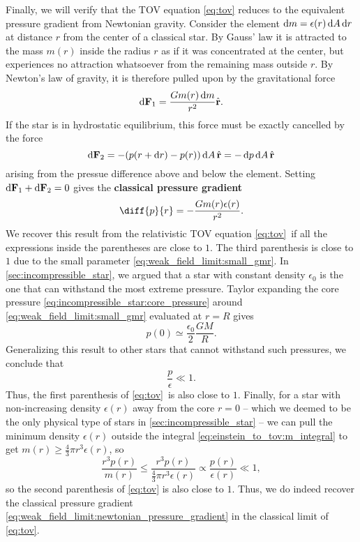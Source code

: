 Finally, we will verify that the TOV equation \eqref{eq:tov} reduces to the equivalent pressure gradient from Newtonian gravity.
Consider the element $\mathop{}\!\mathrm{d} m = \epsilon(r) \mathop{}\!\mathrm{d} A \mathop{}\!\mathrm{d} r$ at distance $r$ from the center of a classical star.
By Gauss' law it is attracted to the mass $m(r)$ inside the radius $r$ as if it was concentrated at the center, but experiences no attraction whatsoever from the remaining mass outside $r$.
By Newton's law of gravity, it is therefore pulled upon by the gravitational force 
\begin{equation}
	\mathop{}\!\mathrm{d} \mathbf{F}_1 = \frac{G m(r) \mathop{}\!\mathrm{d} m}{r^2} \hat{\textbf{r}} .
	\label{eq:weak_field_limit:force_newton}
\end{equation}
If the star is in hydrostatic equilibrium, this force must be exactly cancelled by the force
\begin{equation}
	\mathop{}\!\mathrm{d} \textbf{F}_2 = -(p(r + \mathop{}\!\mathrm{d} r) - p(r)) \mathop{}\!\mathrm{d} A \, \hat{\textbf{r}} = -\mathop{}\!\mathrm{d} p \mathop{}\!\mathrm{d} A \, \hat{\textbf{r}}
	\label{eq:weak_field_limit:force_pressure}
\end{equation}
arising from the pressue difference above and below the element.
Setting $\mathop{}\!\mathrm{d} \textbf{F}_1 + \mathop{}\!\mathrm{d} \textbf{F}_2 = 0$ gives the \textbf{classical pressure gradient}
\begin{equation}
	\diff{p}{r} = -\frac{G m(r) \epsilon(r)}{r^2} .
	\label{eq:weak_field_limit:newtonian_pressure_gradient}
\end{equation}
We recover this result from the relativistic TOV equation \eqref{eq:tov} if all the expressions inside the parentheses are close to $1$.
The third parenthesis is close to $1$ due to the small parameter \eqref{eq:weak_field_limit:small_gmr}.
In \cref{sec:incompressible_star}, we argued that a star with constant density $\epsilon_0$ is the one that can withstand the most extreme pressure.
Taylor expanding the core pressure \eqref{eq:incompressible_star:core_pressure} around \eqref{eq:weak_field_limit:small_gmr} evaluated at $r=R$ gives
\begin{equation}
	p(0) \simeq \frac{\epsilon_0}{2} \frac{G M}{R}.
\end{equation}
Generalizing this result to other stars that cannot withstand such pressures, we conclude that
\begin{equation}
	\frac{p}{\epsilon} \ll 1 .
\end{equation}
Thus, the first parenthesis of \cref{eq:tov} is also close to $1$.
Finally, for a star with non-increasing density $\epsilon(r)$ away from the core $r=0$ -- which we deemed to be the only physical type of stars in \cref{sec:incompressible_star} -- we can pull the minimum density $\epsilon(r)$ outside the integral \eqref{eq:einstein_to_tov:m_integral} to get $m(r) \geq \frac{4}{3} \pi r^3 \epsilon(r)$, so
\begin{equation*}
	\frac{r^3 p(r)}{m(r)} \leq    \frac{r^3 p(r)}{\frac{4}{3} \pi r^3 \epsilon(r)}
	                      \propto \frac{p(r)}{\epsilon(r)}
						  \ll  1 ,
\end{equation*}
so the second parenthesis of \cref{eq:tov} is also close to $1$.
Thus, we do indeed recover the classical pressure gradient \eqref{eq:weak_field_limit:newtonian_pressure_gradient} in the classical limit of \cref{eq:tov}.
